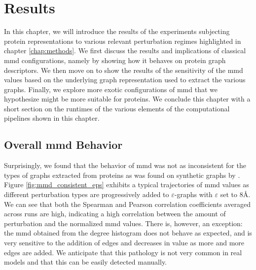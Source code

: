 \chapter{Results}\label{chap:results}

In this chapter, we will introduce the results of the experiments subjecting
protein representations to various relevant perturbation regimes highlighted in
chapter \ref{chap:methods}. We first discuss the results and implications of
classical \acrshort{mmd} configurations, namely by showing how it behaves on protein
graph descriptors. We then move on to show the results of the sensitivity of the \acrshort{mmd}
values based on the underlying graph representation used to extract the various
graphs. Finally, we explore more exotic configurations of \acrshort{mmd} that we
hypothesize might be more suitable for proteins. We conclude this chapter with a
short section on the runtimes of the various elements of the computational
pipelines shown in this chapter.

\section{Overall \acrshort{mmd} Behavior}

Surprisingly, we found that the behavior of \acrshort{mmd} was not as inconsistent for the
types of graphs extracted from proteins as was found on synthetic graphs by
\cite{obray2022evaluation}. Figure \ref{fig:mmd_consistent_eps} exhibits a typical
trajectories of \acrshort{mmd} values as different perturbation types are progressively
added to $\varepsilon$-graphs with $\varepsilon$ set to $8$\si{\angstrom}. We
can see that both the Spearman and Pearson correlation coefficients averaged
across runs are high, indicating a high correlation between the amount of
perturbation and the normalized \acrshort{mmd} values. There is, however, an exception: the
\acrshort{mmd} obtained from the degree histogram does not behave as expected, and is very
sensitive to the addition of edges and decreases in value as more and more edges
are added. We anticipate that this pathology is not very common in real models and
that this can be easily detected manually.


